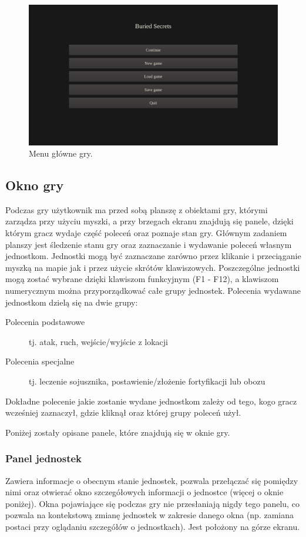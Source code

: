 \documentclass[licencjacka]{pracamgr}
\begin{document}
      \begin{figure}[htbp]
	\centering
	\includegraphics[scale=0.22]{MainMenu.png}
	\caption{Menu główne gry.}
      \end{figure}

    \subsection{Okno gry}
      Podczas gry użytkownik ma przed sobą planszę z obiektami gry, którymi zarządza przy użyciu myszki, a przy brzegach ekranu znajdują się panele,
      dzięki którym gracz wydaje część poleceń oraz poznaje stan gry. Głównym zadaniem planszy jest śledzenie stanu gry oraz zaznaczanie i wydawanie poleceń
      własnym jednostkom. Jednostki mogą być zaznaczane zarówno przez klikanie i przeciąganie myszką na mapie jak i przez użycie skrótów klawiszowych.
      Poszczególne jednostki mogą zostać wybrane dzięki klawiszom funkcyjnym (F1 - F12), a klawiszom numerycznym można przyporządkować całe grupy jednostek.
      Polecenia wydawane jednostkom dzielą się na dwie grupy:
      \begin{description}
       \item[Polecenia podstawowe] tj. atak, ruch, wejście/wyjście z lokacji
       \item[Polecenia specjalne] tj. leczenie sojusznika, postawienie/złożenie fortyfikacji lub obozu
      \end{description}
      Dokładne polecenie jakie zostanie wydane jednostkom zależy od tego, kogo gracz wcześniej zaznaczył, gdzie kliknął oraz której grupy poleceń użył.

      Poniżej zostały opisane panele, które znajdują się w oknie gry.

      \subsubsection{Panel jednostek}
	Zawiera informacje o obecnym stanie jednostek, pozwala przełączać się pomiędzy nimi oraz otwierać okno szczegółowych informacji o jednostce
	(więcej o oknie poniżej). Okna pojawiające się podczas gry nie przesłaniają nigdy tego panelu, co pozwala na kontekstową zmianę jednostek
	w zakresie danego okna (np. zamiana postaci przy oglądaniu szczegółów o jednostkach). Jest położony na górze ekranu.
\end{document}
